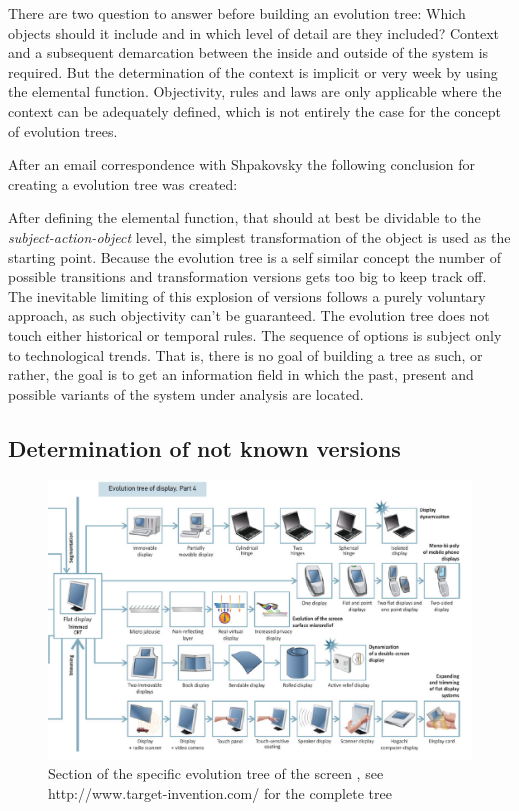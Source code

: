 \documentclass[11pt,a4paper]{article}
\begin{document}
There are two question to answer before building an evolution tree: Which
objects should it include and in which level of detail are they included?
Context and a subsequent demarcation between the inside and outside of the
system is required. But the determination of the context is implicit or very
week by using the elemental function. Objectivity, rules and laws are only
applicable where the context can be adequately defined, which is not entirely
the case for the concept of evolution trees.

After an email correspondence with Shpakovsky the following conclusion for
creating a evolution tree was created:

After defining the elemental function, that should at best be dividable to the
\textit{subject-action-object} level, the simplest transformation of the
object is used as the starting point. Because the evolution tree is a self
similar concept the number of possible transitions and transformation versions
gets too big to keep track off. The inevitable limiting of this explosion of
versions follows a purely voluntary approach, as such objectivity can't be
guaranteed. The evolution tree does not touch either historical or temporal
rules. The sequence of options is subject only to technological trends. That
is, there is no goal of building a tree as such, or rather, the goal is to get
an information field in which the past, present and possible variants of the
system under analysis are located.

\subsection{Determination of not known versions}

\begin{figure}[htb]
  \centering
  \includegraphics[width=.9\linewidth]{figures/removabledisplay.png}
  \caption{\small Section of the specific evolution tree of the screen
    \cite{Shpakovsky2016}, see http://www.target-invention.com/ for the
    complete tree}
	\label{fig:spec_evo}
\end{figure}
\end{document}
